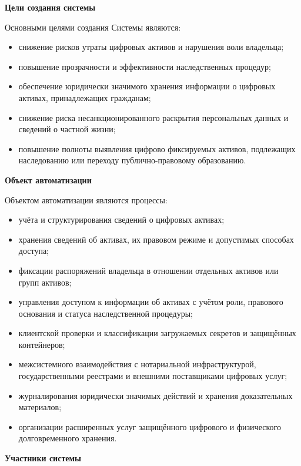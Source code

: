 \textbf{Цели создания системы}

Основными целями создания Системы являются:
\begin{itemize}
    \item снижение рисков утраты цифровых активов и нарушения воли владельца;
    \item повышение прозрачности и эффективности наследственных процедур;
    \item обеспечение юридически значимого хранения информации о цифровых активах, принадлежащих гражданам;
    \item снижение риска несанкционированного раскрытия персональных данных и сведений о частной жизни;
    \item повышение полноты выявления цифрово фиксируемых активов, подлежащих наследованию или переходу публично-правовому образованию.
\end{itemize}

\textbf{Объект автоматизации}

Объектом автоматизации являются процессы:
\begin{itemize}
    \item учёта и структурирования сведений о цифровых активах;
    \item хранения сведений об активах, их правовом режиме и допустимых способах доступа;
    \item фиксации распоряжений владельца в отношении отдельных активов или групп активов;
    \item управления доступом к информации об активах с учётом роли, правового основания и статуса наследственной процедуры;
    \item клиентской проверки и классификации загружаемых секретов и защищённых контейнеров;
    \item межсистемного взаимодействия с нотариальной инфраструктурой, государственными реестрами и внешними поставщиками цифровых услуг;
    \item журналирования юридически значимых действий и хранения доказательных материалов;
    \item организации расширенных услуг защищённого цифрового и физического долговременного хранения.
\end{itemize}

\textbf{Участники системы}

